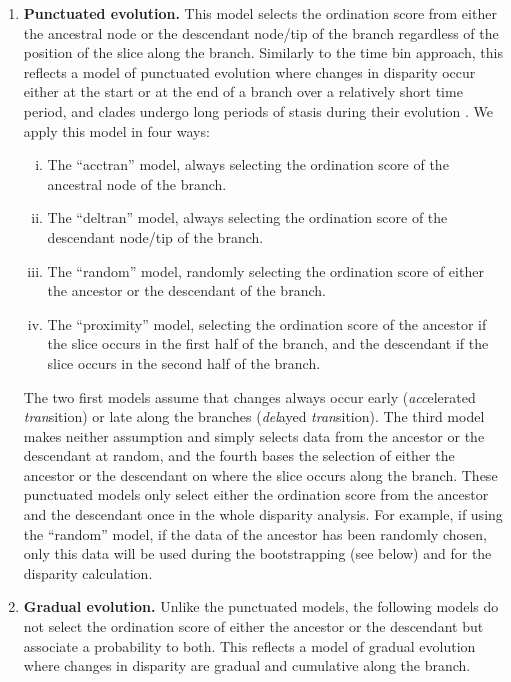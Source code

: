 \documentclass[12pt,a4paper]{article}
\begin{document}
\begin{enumerate}

    \item{\textbf{Punctuated evolution.}} 
    This model selects the ordination score from either the ancestral node or the descendant node/tip of the branch regardless of the position of the slice along the branch. 
    Similarly to the time bin approach, this reflects a model of punctuated evolution where changes in disparity occur either at the start or at the end of a branch over a relatively short time period, and clades undergo long periods of stasis during their evolution \citep{Gould1977,Hunt20112007}.
    We apply this model in four ways: 

    \begin{enumerate}[(i)]

      \item The ``acctran'' model, always selecting the ordination score of the ancestral node of the branch.
      \item The ``deltran'' model, always selecting the ordination score of the descendant node/tip of the branch.
      \item The ``random'' model, randomly selecting the ordination score of either the ancestor or the descendant of the branch.
      \item The ``proximity'' model, selecting the ordination score of the ancestor if the slice occurs in the first half of the branch, and the descendant if the slice occurs in the second half of the branch.

    \end{enumerate}

    The two first models assume that changes always occur early (\textit{acc}elerated \textit{tran}sition) or late along the branches (\textit{del}ayed \textit{tran}sition).
    The third model makes neither assumption and simply selects data from the ancestor or the descendant at random, and the fourth bases the selection of either the ancestor or the descendant on where the slice occurs along the branch.
    These punctuated models only select either the ordination score from the ancestor and the descendant once in the whole disparity analysis.
    For example, if using the ``random'' model, if the data of the ancestor has been randomly chosen, only this data will be used during the bootstrapping (see below) and for the disparity calculation.
    
    \item{\textbf{Gradual evolution.}}
    Unlike the punctuated models, the following models do not select the ordination score of either the ancestor or the descendant but associate a probability to both.
    This reflects a model of gradual evolution where changes in disparity are gradual and cumulative along the branch.


\end{enumerate}
\end{document}
